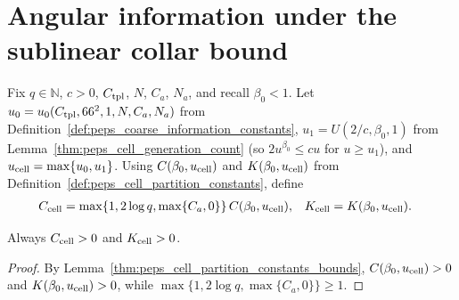 \section{Angular information under the sublinear collar bound}
\label{sec:peps_angular_information_of_collar}

\begin{definition}
    \label{def:peps_cell_information_constants}
    \leanok
    Fix $q\in\mathbb N$, $c>0$, $C_{\rm tpl}$, $N$, $C_a$, $N_a$, and recall $\beta_0<1$. Let
    $u_0=u_0(C_{\rm tpl},66^2,1,N,C_a,N_a)$ from
    Definition~\ref{def:peps_coarse_information_constants},
    $u_1=U(2/c,\beta_0,1)$ from Lemma~\ref{thm:peps_cell_generation_count} (so $2u^{\beta_0}\le cu$ for $u\ge u_1$), and
    $u_{\rm cell}=\max\{u_0,u_1\}$. Using $C(\beta_0,u_{\rm cell})$ and $K(\beta_0,u_{\rm cell})$ from
    Definition~\ref{def:peps_cell_partition_constants}, define
    \begin{align}
        C_{\rm cell}             & =\max\{1,2\log q,\max\{C_a,0\}\}\,
        C(\beta_0,u_{\rm cell}), &
        K_{\rm cell}             & =K(\beta_0,u_{\rm cell}).
        \label{eq:peps_cell_information_constants}
    \end{align}
\end{definition}

\begin{lemma}
    \label{thm:peps_cell_information_constants_pos}
    \leanok
    Always $C_{\rm cell}>0$ and $K_{\rm cell}>0$.
\end{lemma}

\begin{proof}
    \leanok
    By Lemma~\ref{thm:peps_cell_partition_constants_bounds}, $C(\beta_0,u_{\rm cell})>0$ and $K(\beta_0,u_{\rm cell})>0$, while $\max\{1,2\log q,\max\{C_a,0\}\}\ge1$.
\end{proof}

